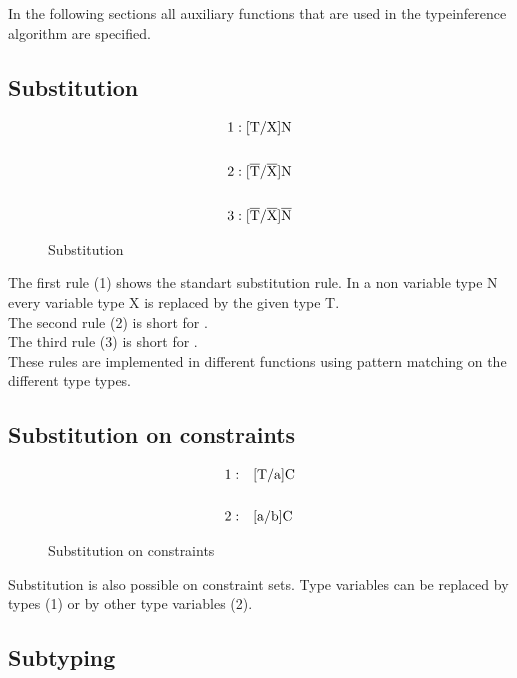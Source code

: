 In the following sections all auxiliary functions that are used in the typeinference algorithm are specified.

\subsection{Substitution}

\begin{figure}[H]
    \begin{align*}
1&: \text{[T/X]N}
\\
\\
2&: \text{[}\overline{\text{T}}/\overline{\text{X}}\text{]N}
\\
\\
3&: \text{[}\overline{\text{T}}/\overline{\text{X}}\text{]}\overline{\text{N}}
    \end{align*}
    \caption{Substitution}
    \label{substitution}
\end{figure}

The first rule (1) shows the standart substitution rule. In a non variable type N every variable type X is replaced by the given type T.
\\
The second rule (2) is short for .
\\
The third rule (3) is short for .
\\
These rules are implemented in different functions using pattern matching on the different type types.

\subsection{Substitution on constraints}

\begin{figure}[H]
    \begin{align*}
        1:& \quad \text{[T/a]C}\\
        \\
        2:& \quad \text{[a/b]C}
    \end{align*}
    \caption{Substitution on constraints}
    \label{substitution_on_constraints}
\end{figure}

Substitution is also possible on constraint sets. Type variables can be replaced by types (1) or by other type variables (2).

\subsection{Subtyping}

